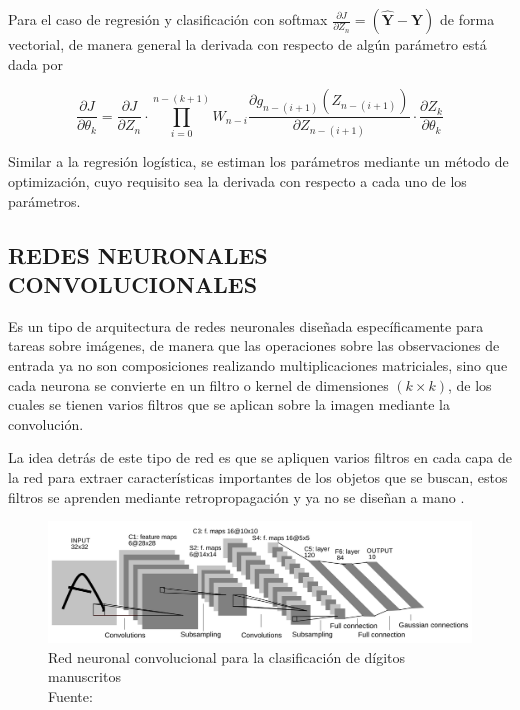 		Para el caso de regresión y clasificación con softmax $\frac{\partial J}{\partial Z_n} = (\mathbf{\hat{Y}} - \mathbf{Y})$ de forma vectorial, de manera general la derivada con respecto de algún parámetro está dada por
		
		\begin{equation}
		    \frac{\partial J}{\partial \theta_k} = \frac{\partial J}{\partial Z_n} \cdot \prod_{i=0}^{n-(k+1)} W_{n-i} \frac{\partial g_{n-(i+1)}(Z_{n-(i+1)})}{\partial Z_{n-(i+1)}} \cdot \frac{\partial Z_k}{\partial \theta_k}
		\end{equation}
		
		Similar a la regresión logística, se estiman los parámetros mediante un método de optimización, cuyo requisito sea la derivada con respecto a cada uno de los parámetros.
		
    \subsection{REDES NEURONALES CONVOLUCIONALES}
        Es un tipo de arquitectura de redes neuronales diseñada específicamente para tareas sobre imágenes, de manera que las operaciones sobre las observaciones de entrada ya no son composiciones realizando multiplicaciones matriciales, sino que cada neurona se convierte en un filtro o kernel de dimensiones $(k \times k)$, de los cuales se tienen varios filtros que se aplican sobre la imagen mediante la convolución.
        
        La idea detrás de este tipo de red es que se apliquen varios filtros en cada capa de la red para extraer características importantes de los objetos que se buscan, estos filtros se aprenden mediante retropropagación y ya no se diseñan a mano \citep{Goodfellow-et-al-2016}.
        
        \begin{figure}[H]
            \centering
            \includegraphics[scale=0.25]{imagenes/lenet}
            \caption[Red neuronal convolucional para la clasificación de dígitos manuscritos]{Red neuronal convolucional para la clasificación de dígitos manuscritos\\ Fuente: \citep{lecun-gradientbased-learning-applied-1998}}
        \end{figure}
        
